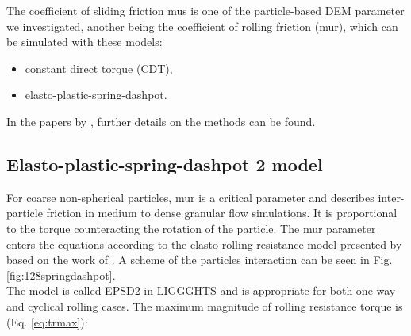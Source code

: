 The coefficient of sliding friction \acs{mus} is 
one of the particle-based \acs{DEM} parameter we investigated, 
another being the coefficient of rolling friction (\acs{mur}),
which can be simulated with these models:
\begin{itemize}
  \item{constant direct torque (CDT),}
  \item{elasto-plastic-spring-dashpot.}
\end{itemize}

In the papers by \citet{RefWorks:41, RefWorks:87, RefWorks:144,
RefWorks:183}, further details on the methods can be found.\\



% 


% 
% 
% 
% 
% 

\subsection{Elasto-plastic-spring-dashpot 2 model}
\label{subsec:epsd2}

For coarse non-spherical particles, \acs{mur} is a critical parameter and describes
inter-particle friction in medium to dense granular flow simulations. 
It is proportional to the 
torque counteracting the rotation of the particle. 
The \acs{mur} parameter enters the 
equations according to the elasto-rolling resistance model presented by
\citet{RefWorks:87, RefWorks:131} based on the work of \citet{RefWorks:143}.
A scheme of the particles interaction can be seen in Fig.
\ref{fig:128springdashpot}.\\

The model is called EPSD2 in \acs{LIGGGHTS} and is appropriate for both one-way and cyclical rolling cases.
The maximum magnitude of rolling resistance torque is (Eq. \ref{eq:trmax}):

